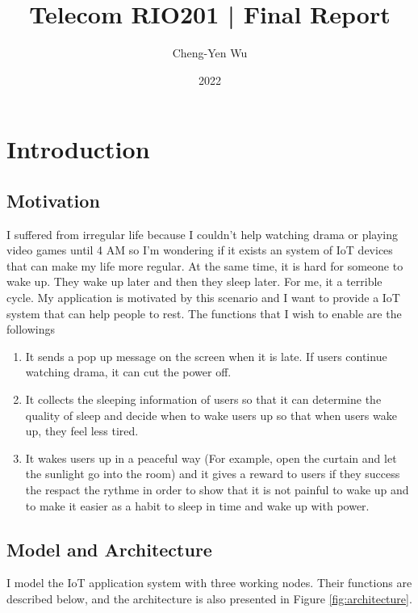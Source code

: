 \documentclass[a4paper]{article}
\title{\vspace{-2.0cm}Telecom RIO201 | Final Report}
\date{2022}
\author{Cheng-Yen Wu}
\begin{document}
\maketitle

\section{Introduction}

\subsection{Motivation}

I suffered from irregular life because I couldn't help watching drama or playing
video games until 4 AM so I'm  wondering if it exists an system of IoT
devices that can make my life more regular. At the same time, it is hard for
someone to wake up. They wake up later and then they sleep later. For me, it a
terrible cycle. My application is motivated by this scenario and I want to
provide a IoT system that can help people to rest. The functions that I wish to
enable are the followings

\begin{enumerate}
    \item It sends a pop up message on the screen when it is late. If users
        continue watching drama, it can cut the power off.
    \item It collects the sleeping information of users so that it can determine
        the quality of sleep and decide when to wake users up so that when users
        wake up, they feel less tired.
    \item It wakes users up in a peaceful way (For example, open the curtain and
        let the sunlight go into the room) and it gives a reward to users if
        they success the respact the rythme in order to show that it is not
        painful to wake up and to make it easier as a habit to sleep in time and
        wake up with power. 
\end{enumerate}

\subsection{Model and Architecture}
I model the IoT application system with three working nodes. Their functions are
described below, and the architecture is also presented in Figure
\ref{fig:architecture}.
\end{document}
